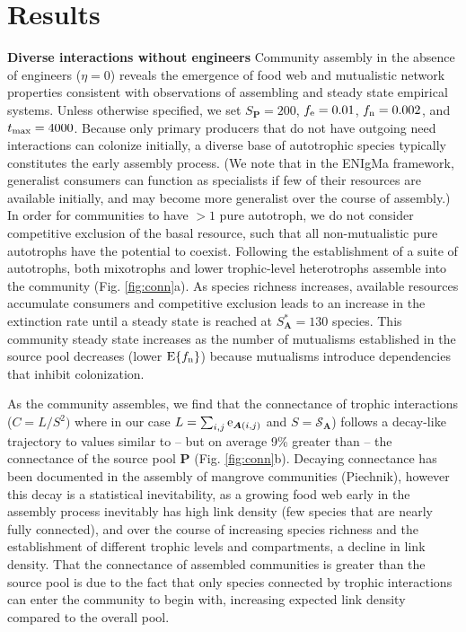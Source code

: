 \documentclass[twocolumn,preprintnumbers,amsmath,amssymb,superscriptaddress]{revtex4}
\newcommand{\rr}[1]{{\rm #1}}
\begin{document}
\section*{Results}

\noindent \textbf{Diverse interactions without engineers} Community assembly in the absence of engineers ($\eta=0$) reveals the emergence of food web and mutualistic network properties consistent with observations of assembling and steady state empirical systems.
Unless otherwise specified, we set $S_{\bm P}=200$, $f_\rr{e}=0.01$, $f_\rr{n}=0.002$, and $t_\rr{max}=4000$.
Because only primary producers that do not have outgoing need interactions can colonize initially, a diverse base of autotrophic species typically constitutes the early assembly process.
(We note that in the ENIgMa framework, generalist consumers can function as specialists if few of their resources are available initially, and may become more generalist over the course of assembly.)
In order for communities to have $>1$ pure autotroph, we do not consider competitive exclusion of the basal resource, such that all non-mutualistic pure autotrophs have the potential to coexist.
Following the establishment of a suite of autotrophs, both mixotrophs and lower trophic-level heterotrophs assemble into the community (Fig. \ref{fig:conn}a).
As species richness increases, available resources accumulate consumers and competitive exclusion leads to an increase in the extinction rate until a steady state is reached at $S^*_{\bm A}=130$ species.
This community steady state increases as the number of mutualisms established in the source pool decreases (lower $\rr{E}\{f_\rr{n}\}$) because mutualisms introduce dependencies that inhibit colonization.


As the community assembles, we find that the connectance of trophic interactions ($C=L/S^2)$ where in our case $L=\sum_{i,j} \rr{e}_{{\bm A}(i,j)}$ and $S = \mathcal{S}_{\bm A}$) follows a decay-like trajectory to values similar to -- but on average 9\% greater than -- the connectance of the source pool $\bm{P}$ (Fig. \ref{fig:conn}b).
Decaying connectance has been documented in the assembly of mangrove communities (Piechnik), however this decay is a statistical inevitability, as a growing food web early in the assembly process inevitably has high link density (few species that are nearly fully connected), and over the course of increasing species richness and the establishment of different trophic levels and compartments, a decline in link density.
That the connectance of assembled communities is greater than the source pool is due to the fact that only species connected by trophic interactions can enter the community to begin with, increasing expected link density compared to the overall pool.
\end{document}
